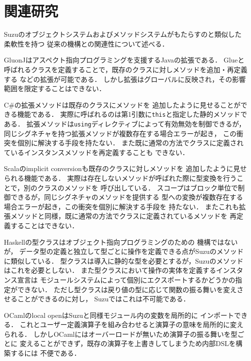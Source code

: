 \documentclass[a4paper,11pt,dvipdfmx]{jreport}
\begin{document}
\chapter{関連研究}
\label{chapter:related-work}

Suzuのオブジェクトシステムおよびメソッドシステムがもたらすのと類似した柔軟性を持つ
従来の機構との関連性について述べる．

GluonJ\cite{GluonJ}はアスペクト指向プログラミングを支援するJavaの拡張である．
Glueと呼ばれるクラスを定義することで，既存のクラスに対しメソッドを追加・再定義する
などの拡張が可能である．
しかし拡張はグローバルに反映され，その影響範囲を限定することはできない．

C\#の拡張メソッド\cite{ExtentionMethods}は既存のクラスにメソッドを
追加したように見せることができる機能である．
実際に呼ばれるのは第1引数に\verb|this|と指定した静的メソッドである．
拡張メソッドは\verb|using|ディレクティブによって有効無効を制御できるが，
同じシグネチャを持つ拡張メソッドが複数存在する場合エラーが起き，
この衝突を個別に解決する手段を持たない．
また既に通常の方法でクラスに定義されているインスタンスメソッドを再定義することも
できない．

Scala\cite{Scala}のimplicit conversionも既存のクラスに対しメソッドを
追加したように見せられる機能である．
実際は存在しないメソッドが呼ばれた際に型変換を行うことで，別のクラスのメソッドを
呼び出している．
スコープはブロック単位で制御できるが，同じシグネチャのメソッドを提供する
型への変換が複数存在する場合エラーが起き，この衝突を個別に解決する手段を
持たない．
またこれも拡張メソッドと同様，既に通常の方法でクラスに定義されているメソッドを
再定義することはできない．

Haskellの型クラス\cite{TypeClasses}はオブジェクト指向プログラミングのための
機構ではないが，
データ型の定義と独立して型ごとに操作を定義できる点がSuzuのメソッドに類似している．
型クラスは導入に静的な型を必要とするが，Suzuのメソッドはこれを必要としない．
また型クラスにおいて操作の実体を定義するインスタンス宣言は
モジュールシステムによって個別にエクスポートするかどうかの指定ができない．
ただし型クラスは戻り値の型に応じて関数の振る舞いを変えさせることができるのに対し，
Suzuではこれは不可能である．

OCaml\cite{OCaml}のlocal openはSuzuと同様モジュール内の変数を局所的に
インポートできる．
これとユーザー定義演算子を組み合わせると演算子の意味を局所的に変えられる．
しかしOCamlにはオーバーロードが無いため演算子の振る舞いを型ごとに
変えることができず，既存の演算子を上書きしてしまうため内部DSLを構築するには
不便である．
\end{document}
